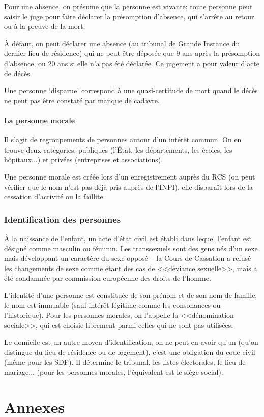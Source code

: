 \documentclass[10pt,a4paper,french]{article}
\begin{document}
Pour une absence, on présume que la personne est vivante: toute personne peut saisir le juge pour faire déclarer la présomption d'absence, qui s'arrête au retour ou à la preuve de la mort.

À défaut, on peut déclarer une absence (au tribunal de Grande Instance du dernier lieu de résidence) qui ne peut être déposée que 9 ans après la présomption d'absence, ou 20 ans si elle n'a pas été déclarée. Ce jugement a pour valeur d'acte de décès.

Une personne `disparue' correspond à une quasi-certitude de mort quand le décès ne peut pas être constaté par manque de cadavre.

\subsection{La personne morale}

Il s'agit de regroupements de  personnes autour d'un intérêt commun. On en trouve deux catégories: publiques (l'État, les départements, les écoles, les hôpitaux...) et privées (entreprises et associations).

Une personne morale est créée lors d'un enregistrement auprès du RCS (on peut vérifier que le nom n'est pas déjà pris auprès de l'INPI), elle disparaît lors de la cessation d'activité ou la faillite.

\section{Identification des personnes}

À la naissance de l'enfant, un acte d'état civil est établi dans lequel l'enfant est désigné comme masculin ou féminin. Les transsexuels sont des gens nés d'un sexe mais développant un caractère du sexe opposé -- la Cours de Cassation a refusé les changements de sexe comme étant des cas de <<déviance sexuelle>>, mais a été condamnée par commission européenne des droits de l'homme.

L'identité d'une personne est constituée de son prénom et de son nom de famille, le nom est immuable (sauf intérêt légitime comme les consonances ou l'historique). Pour les personnes morales, on l'appelle la <<dénomination sociale>>, qui est choisie librement parmi celles qui ne sont pas utilisées.

Le domicile est un autre moyen d'identification, on ne peut en avoir qu'un (qu'on distingue du lieu de résidence ou de logement), c'est une obligation du code civil (même pour les SDF). Il détermine le tribunal, les listes électorales, le lieu de mariage... (pour les  personnes morales, l'équivalent est le siège social).  

\appendix
\part{Annexes}

\printindex
\end{document}
